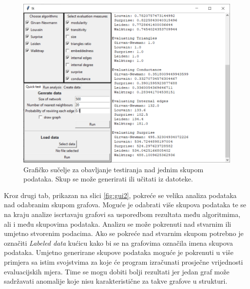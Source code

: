 \begin{figure}
	\includegraphics[width=\linewidth]{images/gui-quick.png}
	\caption{Grafičko sučelje za obavljanje testiranja nad jednim skupom podataka. Skup se može generirati ili učitati iz datoteke.}
	\label{fig:gui1}
\end{figure}


Kroz drugi tab, prikazan na slici \ref{fig:gui2}, pokreće se velika analiza podataka nad odabranim skupom grafova. Moguće je odabrati više skupova podataka te se na kraju analize iscrtavaju grafovi sa usporedbom rezultata među algoritmima, ali i među skupovima podataka. Analizu se može pokrenuti nad stvarnim ili umjetno stvorenim podacima. Ako se pokreće nad stvarnim skupom potrebno je označiti \textit{Labeled data} kućicu kako bi se na grafovima označila imena skupova podataka. Umjetno generirane skupove podataka moguće je pokrenuti u više primjera sa istim svojstvima za koje će program izračunati prosječne vrijednosti evaluacijskih mjera. Time se mogu dobiti bolji rezultati jer jedan graf može sadržavati anomalije koje nisu karakteristične za takve grafove u strukturi.


